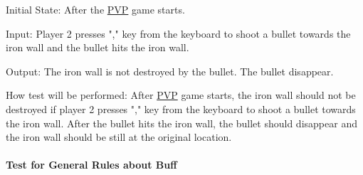 \documentclass[12pt, titlepage]{article}
\begin{document}
\begin{enumerate}
Initial State: After the \underline{PVP} game starts. 
					
Input: Player 2 presses "," key from the keyboard to shoot a bullet towards the iron wall and the bullet hits the iron wall.
					
Output: The iron wall is not destroyed by the bullet. The bullet disappear.
					
How test will be performed: After \underline{PVP} game starts, the iron wall should not be destroyed if player 2 presses "," key from the keyboard to shoot a bullet towards the iron wall. After the bullet hits the iron wall, the bullet should disappear and the iron wall should be still at the original location.

\end{enumerate}

\paragraph{Test for General Rules about Buff}
\end{document}
